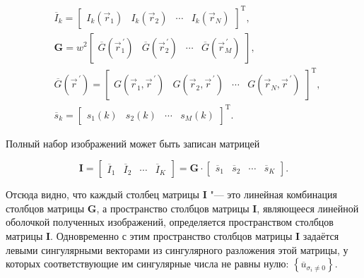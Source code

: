 \begin{align*}
	&{\overline{I}}_k=\left[
		\begin{array}{cccc}
			I_k\left({\vec{r}}_1\right) & I_k\left({\vec{r}}_2\right) & \cdots & I_k\left({\vec{r}}_N\right)
		\end{array}
	\right]^\mathrm{T}, \\
	&\mathbf{G}=w^2 \left[
		\begin{array}{cccc}
			\overline{G}\left({\vec{r}}_1^{\,\prime}\right) & \overline{G}\left({\vec{r}}_2^{\,\prime}\right) & \cdots & \overline{G}\left({\vec{r}}_M^{\,\prime}\right)
		\end{array}
	\right], \\
	&\overline{G}\left({\vec{r}}^{\,\prime}\right)=\left[
		\begin{array}{cccc}
			G\left({\vec{r}}_1,{\vec{r}}^{\,\prime}\right) & G\left({\vec{r}}_2,{\vec{r}}^{\,\prime}\right) & \cdots & G\left({\vec{r}}_N,{\vec{r}}^{\,\prime}\right)
		\end{array}
	\right]^\mathrm{T}, \\
	&{\overline{s}}_k=\left[
		\begin{array}{cccc}
			s_1\left(k\right) & s_2\left(k\right) & \cdots & s_M\left(k\right)
		\end{array}
	\right]^\mathrm{T}.
\end{align*}

Полный набор изображений может быть записан матрицей

\begin{equation*}
	\mathbf{I} = \left[
		\begin{array}{cccc}
			{\overline{I}}_1 & {\overline{I}}_2 & \cdots & {\overline{I}}_K
		\end{array}
	\right] = \mathbf{G} \cdot \left[
		\begin{array}{cccc}
			{\overline{s}}_1 & {\overline{s}}_2 & \cdots & {\overline{s}}_K
		\end{array}
	\right].
\end{equation*}

Отсюда видно, что каждый столбец матрицы $\mathbf{I}$ "--- это линейная комбинация столбцов матрицы $\mathbf{G}$, а пространство столбцов матрицы $\mathbf{I}$, являющееся линейной оболочкой полученных изображений, определяется пространством столбцов матрицы $\mathbf{I}$. Одновременно с этим пространство столбцов матрицы $\mathbf{I}$ задаётся левыми сингулярными векторами из сингулярного разложения этой матрицы, у которых соответствующие им сингулярные числа не равны нулю: $\left\{{\overline{u}}_{\sigma_i\neq0}\right\}$.

